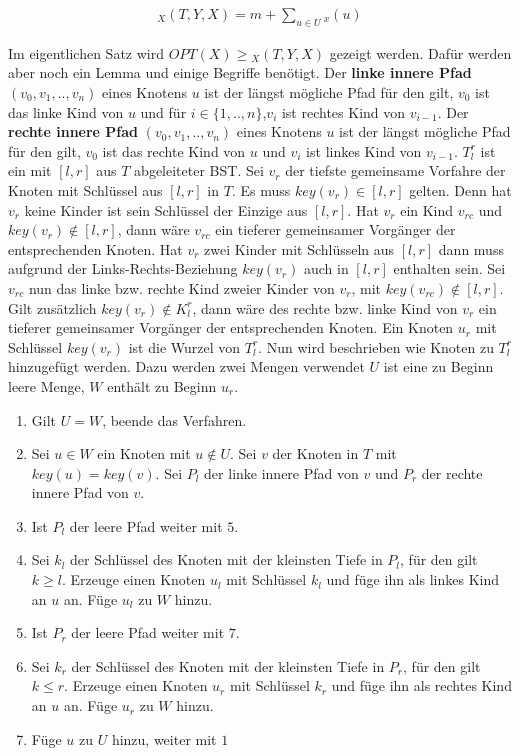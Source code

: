 \documentclass[a4paper,12pt]{article}
\begin{document}
\begin{align*}
_X(T, Y, X)  = m + \sum_{u \in U} {_x} (u)
\end{align*} %

\noindent Im eigentlichen Satz wird $\mathit{OPT}\left(X\right) \geq {_X(T, Y, X)} $ gezeigt werden. Dafür werden aber noch ein Lemma und einige Begriffe benötigt. Der \textbf{linke innere Pfad} $\left(v_0,v_1,..,v_n \right)$ eines Knotens $u$ ist der längst mögliche Pfad für den gilt, $v_0$ ist das linke Kind von $u$ und für $i \in \{1,..,n\}$,$v_i$ ist rechtes Kind von $v_{i-1}$. Der \textbf{rechte innere Pfad} $\left(v_0,v_1,..,v_n \right)$ eines Knotens $u$ ist der längst mögliche Pfad für den gilt, $v_0$ ist das rechte Kind von $u$ und $v_i$ ist linkes Kind von $v_{i-1}$. $T^r_l$ ist ein mit $\left[l,r\right]$ aus $T$ abgeleiteter BST. Sei $v_r$ der tiefste gemeinsame Vorfahre der Knoten mit Schlüssel aus  $\left[l,r\right]$ in $T$. Es muss $\mathit{key}(v_r) \in \left[l,r\right]$ gelten. Denn hat $v_r$ keine Kinder ist sein Schlüssel der Einzige aus $\left[l,r\right]$. Hat $v_r$ ein Kind $v_{rc}$ und $\mathit{key}(v_r) \notin \left[l,r\right]$, dann wäre $v_{rc}$ ein tieferer gemeinsamer Vorgänger der entsprechenden Knoten. Hat $v_r$ zwei Kinder mit Schlüsseln aus $\left[l,r\right]$ dann muss aufgrund der Links-Rechts-Beziehung  $\mathit{key}(v_r)$ auch in $\left[l,r\right]$ enthalten sein. Sei $v_{rc}$ nun das linke bzw. rechte Kind zweier  Kinder von $v_r$, mit $\mathit{key}(v_{rc}) \notin \left[l,r\right]$. Gilt zusätzlich $\mathit{key}(v_r) \notin K^r_l$, dann wäre des rechte bzw. linke Kind von $v_r$ ein tieferer gemeinsamer Vorgänger der entsprechenden Knoten. Ein Knoten $u_r$ mit Schlüssel $\mathit{key}(v_r)$ ist die Wurzel von $T^r_l$. Nun wird beschrieben wie Knoten zu $T^r_l$ hinzugefügt werden.
Dazu werden zwei Mengen verwendet $U$ ist eine zu Beginn leere Menge, $W$ enthält zu Beginn $u_r$.
\begin{enumerate}
	\item Gilt $U = W$, beende das Verfahren.
	\item Sei $u \in W$ ein Knoten mit $u \notin U$.  Sei $v$ der Knoten in $T$ mit $\mathit{key}(u ) = \mathit{key}(v)$. Sei $P_l$ der linke innere Pfad von $v$ und $P_r$ der rechte innere Pfad von $v$.
	\item Ist $P_l$ der leere Pfad weiter mit $5$.
	\item Sei $k_l$ der Schlüssel des Knoten mit der kleinsten Tiefe in $P_l$, für den gilt $k \geq l$. Erzeuge einen Knoten $u_l$ mit Schlüssel $k_l$ und füge ihn als linkes Kind an $u$ an. Füge $u_l$ zu $W$ hinzu.
	\item Ist $P_r$ der leere Pfad weiter mit $7$.
	\item Sei $k_r$ der Schlüssel des Knoten mit der kleinsten Tiefe in $P_r$, für den gilt  $k \leq r$. Erzeuge einen Knoten $u_r$ mit Schlüssel $k_r$ und füge ihn als rechtes Kind an $u$ an. Füge $u_r$ zu $W$ hinzu.	
	\item Füge $u$ zu $U$ hinzu, weiter mit $1$
\end{enumerate}
\end{document}

